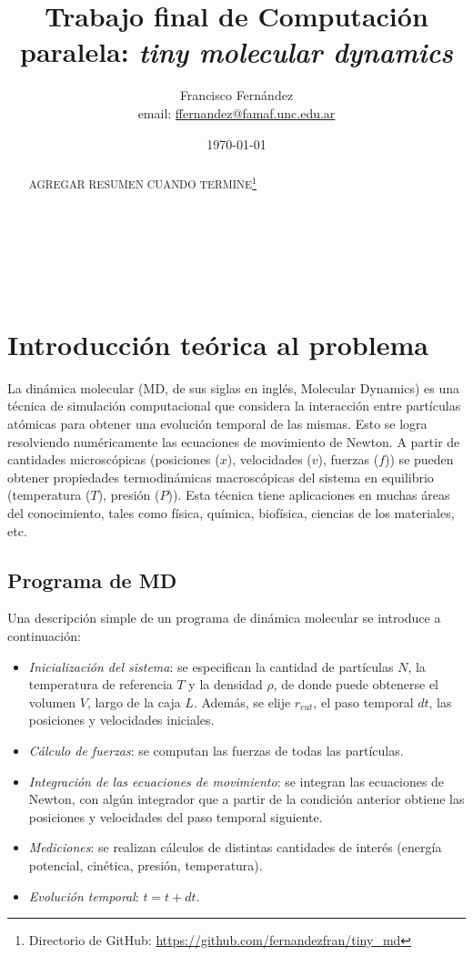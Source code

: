 \documentclass[a4paper,spanish,12pt,twoside]{article}
\title{Trabajo final de Computación paralela: \textit{tiny molecular dynamics}}
\author{Francisco Fernández \\ \small{email: \href{mailto:ffernandez@famaf.unc.edu.ar}{ffernandez@famaf.unc.edu.ar}}}
\date{\today}
\begin{document}
\maketitle

\

\

\begin{abstract}

AGREGAR RESUMEN CUANDO TERMINE\footnote{Directorio de GitHub: \url{https://github.com/fernandezfran/tiny_md}}%


\end{abstract}


\section{Introducción teórica al problema}

La dinámica molecular (MD, de sus siglas en inglés, Molecular Dynamics) es una técnica de simulación computacional que considera la interacción entre partículas atómicas para obtener una evolución temporal de las mismas. Esto se logra resolviendo numéricamente las ecuaciones de movimiento de Newton. A partir de cantidades microscópicas (posiciones ($x$), velocidades ($v$), fuerzas ($f$)) se pueden obtener propiedades termodinámicas macroscópicas del sistema en equilibrio (temperatura ($T$), presión ($P$)). Esta técnica tiene aplicaciones en muchas áreas del conocimiento, tales como física, química, biofísica, ciencias de los materiales, etc.

\subsection{Programa de MD}

Una descripción simple de un programa de dinámica molecular se introduce a continuación:

\begin{itemize}
 \item \textit{Inicialización del sistema}: se especifican la cantidad de partículas $N$, la temperatura de referencia $T$ y la densidad $\rho$, de donde puede obtenerse el volumen $V$, largo de la caja $L$. Además, se elije $r_{cut}$, el paso temporal $dt$, las posiciones y velocidades iniciales.
 \item \textit{Cálculo de fuerzas}: se computan las fuerzas de todas las partículas.
 \item \textit{Integración de las ecuaciones de movimiento}: se integran las ecuaciones de Newton, con algún integrador que a partir de la condición anterior obtiene las posiciones y velocidades del paso temporal siguiente.
 \item \textit{Mediciones}: se realizan cálculos de distintas cantidades de interés (energía potencial, cinética, presión, temperatura).
 \item \textit{Evolución temporal}: $t = t + dt$.
\end{itemize}
\end{document}
